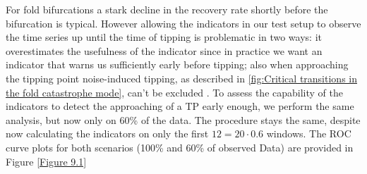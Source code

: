 \documentclass[%
thesis=student,%
coverpage=false,%
titlepage=false,%
headmarks=true, %
english,%
font=libertine, %
math=newpxtx, %
BCOR=5mm,%
coverBCOR=11mm%
]{tumbook}
\begin{document}
For fold bifurcations a stark decline in the recovery rate shortly before the bifurcation is typical. However allowing the indicators in our test setup to observe the time series up until the time of tipping is problematic in two ways: it overestimates the usefulness of the indicator since in practice we want an indicator that warns us sufficiently early before tipping; also when approaching the tipping point noise-induced tipping, as described in \ref{fig:Critical transitions in the fold catastrophe mode}, can't be excluded \cite{Ashwin:2012,Meng:2020}. To assess the capability of the indicators to detect the approaching of a TP early enough, we perform the same analysis, but now only on 60\% of the data. The procedure stays the same, despite now calculating the indicators on only the first $12 = 20 \cdot 0.6$ windows. The ROC curve plots for both scenarios (100\% and 60\% of observed Data) are provided in Figure \ref{Figure 9.1}
\end{document}
